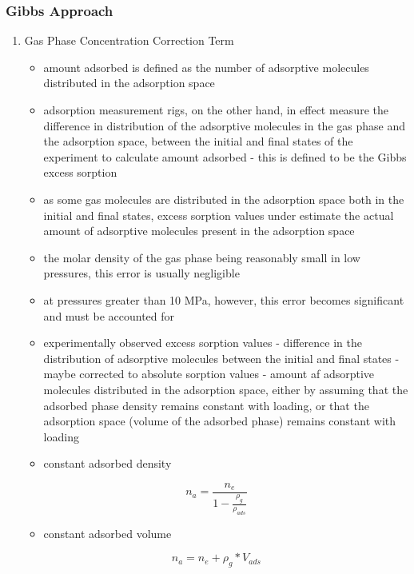 \documentclass[11pt]{article}
\begin{document}
\subsubsection{Gibbs Approach}
\label{sec:org10690e8}
\begin{enumerate}
\item Gas Phase Concentration Correction Term
\label{sec:org2777d63}
\begin{itemize}
\item amount adsorbed is defined as the number of adsorptive molecules distributed in the adsorption space
\item adsorption measurement rigs, on the other hand, in effect measure the difference in distribution of the adsorptive molecules in the gas phase and the adsorption space, between the initial and final states of the experiment to calculate amount adsorbed - this is defined to be the Gibbs excess sorption \cite{Rouquerol2016}
\item as some gas molecules are distributed in the adsorption space both in the initial and final states, excess sorption values under estimate the actual amount of adsorptive molecules present in the adsorption space
\item the molar density of the gas phase being reasonably small in low pressures, this error is usually negligible
\item at pressures greater than 10 MPa, however, this error becomes significant and must be accounted for
\item experimentally observed excess sorption values - difference in the distribution of adsorptive molecules between the initial and final states - maybe corrected to absolute sorption values - amount af adsorptive molecules distributed in the adsorption space, either by assuming that the adsorbed phase density remains constant with loading, or that the adsorption space (volume of the adsorbed phase) remains constant with loading
\item constant adsorbed density
\end{itemize}
\begin{equation}
n_{a} = \frac{n_{e}}{1-\frac{\rho_{g}}{\rho_{ads}}}
\end{equation}
\begin{itemize}
\item constant adsorbed volume
\end{itemize}
\begin{equation}
n_{a} = n_{e} + \rho_g * V_{ads}
\end{equation}

\end{enumerate}
\end{document}
